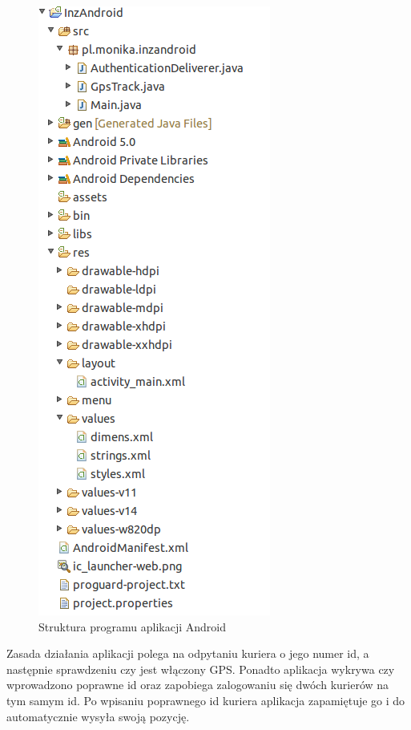 \documentclass[eng,printmode,oneside]{mgr}
\begin{document}
\begin{figure}
\centering
\captionsetup{justification=centering,margin=0cm}
\vspace{-30pt}
\begin{center}
\includegraphics[width=.3\textwidth]{struktura_android.png}
\end{center}
\vspace{-20pt}
  \caption{Struktura programu aplikacji Android}
\vspace{-10pt}
\label{android}
\end{figure}

Zasada działania aplikacji polega na odpytaniu kuriera o jego numer id, a
następnie sprawdzeniu czy jest włączony GPS. Ponadto aplikacja wykrywa czy
wprowadzono poprawne id oraz zapobiega zalogowaniu się dwóch kurierów na tym
samym id. Po wpisaniu poprawnego id kuriera aplikacja zapamiętuje go i do
automatycznie wysyła swoją pozycję.
\end{document}
